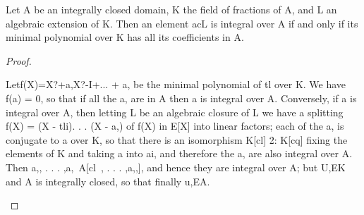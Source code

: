 \begin{theorem}[Theorem 9.2]\label{mcrt-auto-theorem-9-2}\uses{}
\begin{mathematicalrecord}
Let A be an integrally closed domain, K the field of fractions
of A, and L an algebraic extension of K. Then an element acL is integral
over A if and only if its minimal polynomial over K has all its coefficients
in A.
\end{mathematicalrecord}
\end{theorem}
\begin{proof}
\begin{mathematicalrecord}
Letf(X)=X?+a,X?-I+...              + a, be the minimal polynomial of tl
over K. We have f(a) = 0, so that if all the a, are in A then a is integral over
A. Conversely, if a is integral over A, then letting L be an algebraic closure of
L we have a splitting f(X) = (X - tli). . . (X - a,) of f(X) in E[X] into linear
factors; each of the a, is conjugate to a over K, so that there is an
isomorphism K[cl] 2: K[cq] fixing the elements of K and taking a into ai,
and therefore the a, are also integral over A. Then a,, . . . ,a,~A[cl~, . . . ,a,,],
and hence they are integral over A; but U,EK and A is integrally closed,
so that finally u,EA.
\end{mathematicalrecord}
\end{proof}


